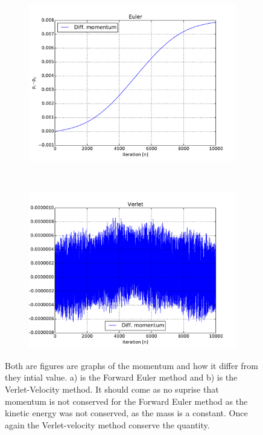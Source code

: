 




\begin{figure}[H]
    \centering
    \begin{subfigure}{0.5\textwidth}
        \centering
        \includegraphics[width=\linewidth]{result/bilder/momentum-euler.pdf}
    	\caption{}
    \end{subfigure}%
    ~ 
    \begin{subfigure}{0.5\textwidth}
        \centering
        \includegraphics[width=\linewidth]{result/bilder/momentum-verlet.pdf}
        \caption{}
    \end{subfigure}
    \caption{Both are figures are graphs of the momentum and how it differ from they intial value. a) is the Forward Euler method and b) is the Verlet-Velocity method. It should come as no suprise that momentum is not conserved for the Forward Euler method as the kinetic energy was not conserved, as the mass is a constant. Once again the Verlet-velocity method conserve the quantity. 
    }
    \label{fig:conserved-momentum}
\end{figure}





